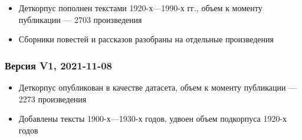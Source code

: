 \documentclass[
]{article}
\providecommand{\tightlist}{%
  \setlength{\itemsep}{0pt}\setlength{\parskip}{0pt}}
\begin{document}
\begin{itemize}
\tightlist
\item
  Деткорпус пополнен текстами 1920-х---1990-х гг., объем к моменту
  публикации --- 2703 произведения
\item
  Сборники повестей и рассказов разобраны на отдельные произведения
\end{itemize}

\hypertarget{ux432ux435ux440ux441ux438ux44f-v1-2021-11-08}{%
\subsubsection{Версия V1,
2021-11-08}\label{ux432ux435ux440ux441ux438ux44f-v1-2021-11-08}}

\begin{itemize}
\tightlist
\item
  Деткорпус опубликован в качестве датасета, объем к моменту публикации
  --- 2273 произведения
\item
  Добавлены тексты 1900-х---1930-х годов, удвоен объем подкорпуса 1920-х
  годов
\end{itemize}
\end{document}
